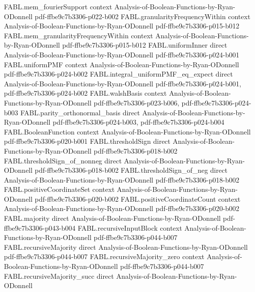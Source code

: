 \begin{theorem}
\proofstep
  {FABL.mem_fourierSupport}
  {context}
  {Analysis-of-Boolean-Functions-by-Ryan-ODonnell}
  {pdf-ffbe9c7b3306-p022-b002}
\proofstep
  {FABL.granularityFrequencyWithin}
  {context}
  {Analysis-of-Boolean-Functions-by-Ryan-ODonnell}
  {pdf-ffbe9c7b3306-p015-b012}
\proofstep
  {FABL.mem_granularityFrequencyWithin}
  {context}
  {Analysis-of-Boolean-Functions-by-Ryan-ODonnell}
  {pdf-ffbe9c7b3306-p015-b012}
\proofstep
  {FABL.uniformInner}
  {direct}
  {Analysis-of-Boolean-Functions-by-Ryan-ODonnell}
  {pdf-ffbe9c7b3306-p024-b001}
\proofstep
  {FABL.uniformPMF}
  {context}
  {Analysis-of-Boolean-Functions-by-Ryan-ODonnell}
  {pdf-ffbe9c7b3306-p024-b002}
\proofstep
  {FABL.integral_uniformPMF_eq_expect}
  {direct}
  {Analysis-of-Boolean-Functions-by-Ryan-ODonnell}
  {pdf-ffbe9c7b3306-p024-b001,
    pdf-ffbe9c7b3306-p024-b002}
\proofstep
  {FABL.walshBasis}
  {context}
  {Analysis-of-Boolean-Functions-by-Ryan-ODonnell}
  {pdf-ffbe9c7b3306-p023-b006,
    pdf-ffbe9c7b3306-p024-b003}
\proofstep
  {FABL.parity_orthonormal_basis}
  {direct}
  {Analysis-of-Boolean-Functions-by-Ryan-ODonnell}
  {pdf-ffbe9c7b3306-p024-b003,
    pdf-ffbe9c7b3306-p024-b004}
\proofstep
  {FABL.BooleanFunction}
  {context}
  {Analysis-of-Boolean-Functions-by-Ryan-ODonnell}
  {pdf-ffbe9c7b3306-p020-b001}
\proofstep
  {FABL.thresholdSign}
  {direct}
  {Analysis-of-Boolean-Functions-by-Ryan-ODonnell}
  {pdf-ffbe9c7b3306-p018-b002}
\proofstep
  {FABL.thresholdSign_of_nonneg}
  {direct}
  {Analysis-of-Boolean-Functions-by-Ryan-ODonnell}
  {pdf-ffbe9c7b3306-p018-b002}
\proofstep
  {FABL.thresholdSign_of_neg}
  {direct}
  {Analysis-of-Boolean-Functions-by-Ryan-ODonnell}
  {pdf-ffbe9c7b3306-p018-b002}
\proofstep
  {FABL.positiveCoordinateSet}
  {context}
  {Analysis-of-Boolean-Functions-by-Ryan-ODonnell}
  {pdf-ffbe9c7b3306-p020-b002}
\proofstep
  {FABL.positiveCoordinateCount}
  {context}
  {Analysis-of-Boolean-Functions-by-Ryan-ODonnell}
  {pdf-ffbe9c7b3306-p020-b002}
\proofstep
  {FABL.majority}
  {direct}
  {Analysis-of-Boolean-Functions-by-Ryan-ODonnell}
  {pdf-ffbe9c7b3306-p043-b004}
\proofstep
  {FABL.recursiveInputBlock}
  {context}
  {Analysis-of-Boolean-Functions-by-Ryan-ODonnell}
  {pdf-ffbe9c7b3306-p044-b007}
\proofstep
  {FABL.recursiveMajority}
  {direct}
  {Analysis-of-Boolean-Functions-by-Ryan-ODonnell}
  {pdf-ffbe9c7b3306-p044-b007}
\proofstep
  {FABL.recursiveMajority_zero}
  {context}
  {Analysis-of-Boolean-Functions-by-Ryan-ODonnell}
  {pdf-ffbe9c7b3306-p044-b007}
\proofstep
  {FABL.recursiveMajority_succ}
  {direct}
  {Analysis-of-Boolean-Functions-by-Ryan-ODonnell}

\end{theorem}
